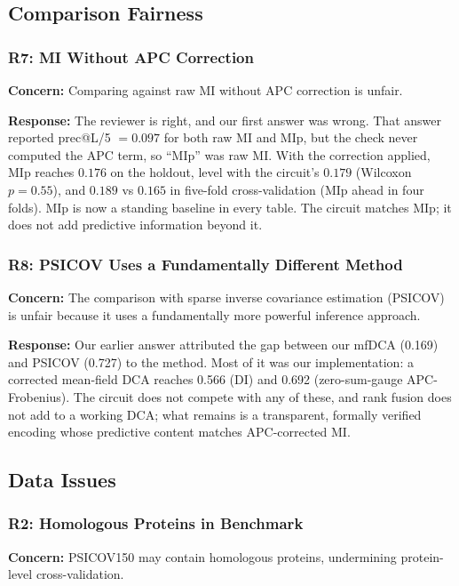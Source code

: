 \subsection{Comparison Fairness}

\subsubsection{R7: MI Without APC Correction}
\textbf{Concern:} Comparing against raw MI without APC correction is unfair.

\textbf{Response:} The reviewer is right, and our first answer was wrong.
That answer reported prec@L/5 $= 0.097$ for both raw MI and MIp, but the check
never computed the APC term, so ``MIp'' was raw MI.  With the correction
applied, MIp reaches $0.176$ on the holdout, level with the circuit's $0.179$
(Wilcoxon $p = 0.55$), and $0.189$ vs $0.165$ in five-fold cross-validation
(MIp ahead in four folds).  MIp is now a standing baseline in every table.
The circuit matches MIp; it does not add predictive information beyond it.

\subsubsection{R8: PSICOV Uses a Fundamentally Different Method}
\textbf{Concern:} The comparison with sparse inverse covariance estimation
(PSICOV) is unfair because it uses a fundamentally more powerful inference
approach.

\textbf{Response:} Our earlier answer attributed the gap between our
mfDCA (0.169) and PSICOV (0.727) to the method.  Most of it was our
implementation: a corrected mean-field DCA reaches 0.566 (DI) and 0.692
(zero-sum-gauge APC-Frobenius).  The circuit does not compete with any of
these, and rank fusion does not add to a working DCA; what remains is a
transparent, formally verified encoding whose predictive content matches
APC-corrected MI.

\subsection{Data Issues}

\subsubsection{R2: Homologous Proteins in Benchmark}
\textbf{Concern:} PSICOV150 may contain homologous proteins, undermining
protein-level cross-validation.

